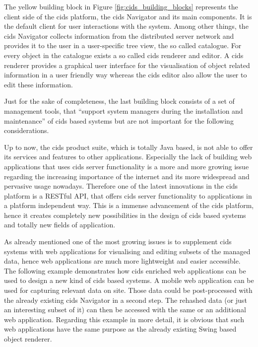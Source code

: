  
The yellow building block in Figure \ref{fig:cids_building_blocks} represents the client side of the cids platform, the cids Navigator and its main components.
It is the default client for user interactions with the system.
Among other things, the cids Navigator collects information from the distributed server network and provides it to the user in a user-specific tree view, the so called catalogue.
For every object in the catalogue exists a so called cids renderer and editor.
A cids renderer provides a graphical user interface for the visualisation of object related information in a user friendly way whereas the cids editor also allow the user to edit these information.

Just for the sake of completeness, the last building block consists of a set of management tools, that ``support system managers during the installation and maintenance'' \autocite[]{cismet-cids-readMe} of cids based systems but are not important for the following considerations.

Up to now, the cids product suite, which is totally Java based, is not able to offer its services and features to other applications.
Especially the lack of building web applications that uses cids server functionality is a more and more growing issue regarding the increasing importance of the internet and its more widespread and pervasive usage nowadays.
Therefore one of the latest innovations in the cids platform is a RESTful API, that offers cids server functionality to applications in a platform independent way.
This is a immense advancement of the cids platform, hence it creates completely new possibilities in the design of cids based systems and totally new fields of application.

As already mentioned one of the most growing issues is to supplement cids systems with web applications for visualising and editing subsets of the managed data, hence web applications are much more lightweight and easier accessible.
The following example demonstrates how cids enriched web applications can be used to design a new kind of cids based systems.
A mobile web application can be used for capturing relevant data on site.
Those data could be post-processed with the already existing cids Navigator in a second step.
The rehashed data (or just an interesting subset of it) can then be accessed with the same or an additional web application.
Regarding this example in more detail, it is obvious that such web applications have the same  purpose as the already existing Swing based object renderer.


